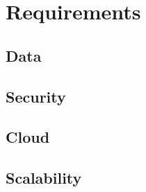 \chapter{Requirements}
\label{cap:requirements}

\section{Data}
\section{Security}
\section{Cloud}
\section{Scalability}

